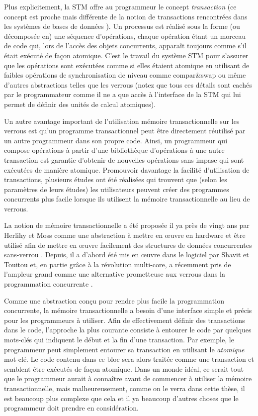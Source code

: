 Plus explicitement, la STM offre au programmeur le concept {\it transaction} (ce concept est proche mais différente
de la notion de transactions rencontrées dans les systèmes de bases de données \cite{FFGH08, HCUAGSV07, HL08}).
Un processus est réalisé sous la forme (ou décomposée en) une séquence d'opérations,
chaque opération étant un morceau de code qui, lors de l'accès des objets concurrents, apparaît toujours comme s'il était exécuté de façon atomique.
C'est le travail du système STM pour s'assurer que les opérations sont exécutées comme
si elles étaient atomique en utilisant de faibles opérations de synchronisation de niveau comme compar\&swap ou même d'autres
abstractions telles que les verrous (notez que tous ces détails sont cachés par le programmateur
comme il ne a que accès à l'interface de la STM qui lui permet de définir des unités de calcul atomiques).


Un autre avantage important de l'utilisation mémoire transactionnelle sur les verrous est 
qu'un programme transactionnel peut être directement réutilisé par un autre programmeur dans son propre code.
Ainsi, un programmeur qui compose opérations à partir d'une bibliothèque d'opérations à une 
autre transaction est garantie d'obtenir de nouvelles opérations sans impase qui sont exécutées de manière atomique.
Promouvoir davantage la facilité d'utilisation de transactions, plusieurs études \cite{PA11, RHW10} ont été réalisées qui
trouvent que (selon les paramètres de leurs études) les utilisateurs peuvent créer des programmes concurrents plus facile 
lorsque ils utilisent la mémoire transactionnelle au lieu de verrous.


La notion de mémoire transactionnelle a été proposée il ya près de vingt ans par Herlihy et Moss comme une abstraction à mettre
en œuvre en hardware et être utilisé afin de mettre en œuvre facilement des structures de données concurrentes sans-verrou \cite{HM93}.
Depuis, il a d'abord été mis en œuvre dans le logiciel par Shavit et Touitou \cite{ST97} et, en partie grâce à la
révolution multi-core, a récemment pris de l'ampleur grand comme une alternative prometteuse aux verrous dans la programmation concurrente \cite{FFGH08,HCUAGSV07,LK08,R08}.


Comme une abstraction conçu pour rendre plus facile la programmation concurrente, la mémoire transactionnelle a
besoin d'une interface simple et précis pour les programmeurs à utiliser.
Afin de effectivement définir des transactions dans le code,
l'approche la plus courante consiste à entourer le code par quelques mots-clés qui indiquent le début et la fin d'une transaction.
Par exemple, le programmeur peut simplement entourer sa transaction en utilisant le \emph{atomique} mot-clé.
Le code contenu dans ce bloc sera alors traitée comme une transaction et semblent être exécutés de façon atomique.
Dans un monde idéal, ce serait tout que le programmeur aurait à connaître avant de commencer à utiliser la mémoire transactionnelle,
mais malheureusement, comme on le verra dans cette thèse, il est beaucoup plus complexe que cela et il ya beaucoup d'autres choses que le programmeur doit prendre en considération.



